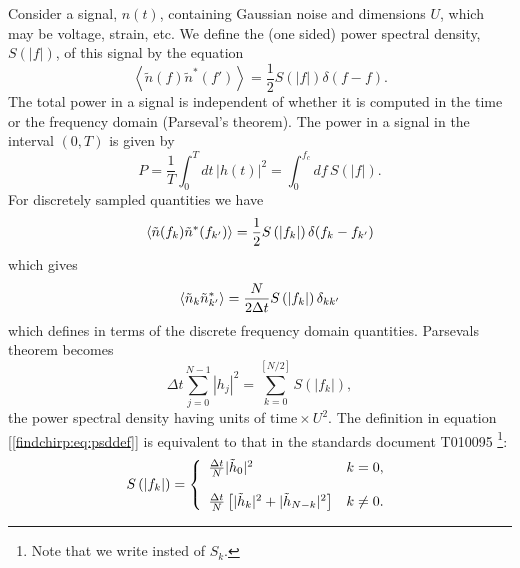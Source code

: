 Consider a signal, $n(t)$, containing Gaussian noise and dimensions $U$, which
may be voltage, strain, etc. We define the (one sided) power spectral density,
$S(|f|)$, of this signal by the equation
\begin{equation}
\left\langle\tilde{n}(f) \tilde{n}^\ast(f')\right\rangle = 
\frac{1}{2}S\left(\left|f\right|\right)\delta(f-f).
\end{equation}
The total power in a signal is independent of whether it is computed in the
time or the frequency domain (Parseval's theorem). The power in a signal in
the interval $(0,T)$  is given by
\begin{equation}
P = \frac{1}{T} \int_{0}^{T} dt\, \left|h(t)\right|^2 = 
\int_{0}^{f_c} df\, S\left(\left|f\right|\right).
\end{equation}
For discretely sampled quantities we have
\begin{equation}
\left\langle\tilde{n}(f_k) \tilde{n}^\ast(f_{k'})\right\rangle = 
\frac{1}{2}S\left(\left|f_{k}\right|\right)\delta(f_k-f_{k'})
\end{equation}
which gives
\begin{equation}
\label{findchirp:eq:ospsddef}
\left\langle\tilde{n}_k \tilde{n}_{k'}^\ast\right\rangle = 
\frac{N}{2\Delta t}S\left(\left|f_{k}\right|\right)\delta_{kk'}
\end{equation}
which defines \ospsd in terms of the discrete frequency domain quantities.
Parsevals theorem becomes
\begin{equation}
\Delta t \sum_{j=0}^{N-1} |h_j|^2 
= \sum_{k=0}^{[N/2]} S\left(\left|f_k\right|\right),
\end{equation}
the power spectral density having units of $\textrm{time}\times U^2$. The
definition in equation [\ref{findchirp:eq:psddef}] is equivalent to that in
the standards document T010095%
\footnote{Note that we write \ospsd insted of $S_k$.}:
\begin{equation}
S\left(\left|f_{k}\right|\right) = \left\{
\begin{array}{ll}
\frac{\Delta t}{N} | \tilde{h}_0 |^2 & k = 0, \\
\\
\frac{\Delta t}{N} \left[ | \tilde{h}_k |^2 + | \tilde{h}_{N-k} |^2 \right] &
k\neq 0.
\end{array}
\right.
\end{equation}

\newpage
\newpage
\newpage
\newpage
\newpage
